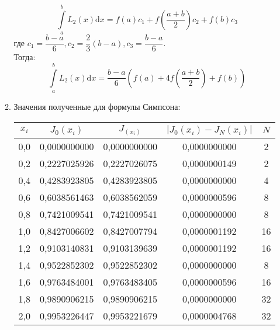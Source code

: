 \documentclass[14pt]{article}
\begin{document}
\begin{enumerate}[label = \arabic*.]
\begin{enumerate}
{\begin{equation}
                \int\limits_{a}^{b}L_2(x)\mathrm{d}x = f(a)c_1 + f\left(\frac{a+b}{2}\right)c_2 + f(b)c_3
            \end{equation}
            где $c_1 = \dfrac{b-a}{6}, c_2 = \dfrac{2}{3}(b - a), c_3 = \dfrac{b-a}{6}.$\\
            \hfill\break
            Тогда:
            \begin{equation}
                \int\limits_{a}^{b}L_2(x)\mathrm{d}x = \frac{b-a}{6}\left(f(a) + 4f\left(\frac{a+b}{2}\right)+f(b)\right)
            \end{equation}
            }
            \item {Значения полученные для формулы Симпсона:
            \begin{table}[h]
            \centering
            \begin{tabular}{|c|c|c|c|c|}
                \hline
                $x_i$ & $J_0(x_i)$ & $J_(x_i)$ & $\left|J_0(x_i) - J_N(x_i)\right|$ & $N$\\
                \hline
                0,0 & 0,0000000000 & 0,0000000000 & 0,0000000000 & 2\\
                \hline
                0,2 & 0,2227025926 & 0,2227026075 & 0,0000000149 & 2\\
                \hline
                0,4 & 0,4283923805 & 0,4283923805 & 0,0000000000 & 4\\
                \hline
                0,6 & 0,6038561463 & 0,6038562059 & 0,0000000596 & 8\\
                \hline
                0,8 & 0,7421009541 & 0,7421009541 & 0,0000000000 & 8\\
                \hline
                1,0 & 0,8427006602 & 0,8427007794 & 0,0000001192 & 16\\
                \hline
                1,2 & 0,9103140831 & 0,9103139639 & 0,0000001192 & 16\\
                \hline
                1,4 & 0,9522852302 & 0,9522852302 & 0,0000000000 & 8\\
                \hline
                1,6 & 0,9763484001 & 0,9763483405 & 0,0000000596 & 16\\
                \hline
                1,8 & 0,9890906215 & 0,9890906215 & 0,0000000000 & 32\\
                \hline
                2,0 & 0,9953226447 & 0,9953221679 & 0,0000004768 & 32\\
                \hline
            \end{tabular}

\end{table}}
\end{enumerate}
\end{enumerate}
\end{document}
